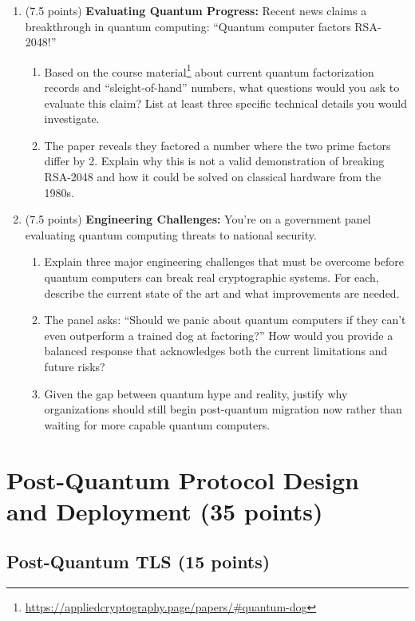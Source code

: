 \documentclass[10pt,a4paper,american]{article}
\begin{document}
\begin{enumerate}
	\item (7.5 points) \textbf{Evaluating Quantum Progress:}
	      Recent news claims a breakthrough in quantum computing: ``Quantum computer factors RSA-2048!''
	      \begin{enumerate}
		      \item Based on the course material\footnote{\url{https://appliedcryptography.page/papers/\#quantum-dog}} about current quantum factorization records and ``sleight-of-hand'' numbers, what questions would you ask to evaluate this claim? List at least three specific technical details you would investigate.
		      \item The paper reveals they factored a number where the two prime factors differ by 2. Explain why this is not a valid demonstration of breaking RSA-2048 and how it could be solved on classical hardware from the 1980s.
	      \end{enumerate}
	\item (7.5 points) \textbf{Engineering Challenges:}
	      You're on a government panel evaluating quantum computing threats to national security.
	      \begin{enumerate}
		      \item Explain three major engineering challenges that must be overcome before quantum computers can break real cryptographic systems. For each, describe the current state of the art and what improvements are needed.
		      \item The panel asks: ``Should we panic about quantum computers if they can't even outperform a trained dog at factoring?'' How would you provide a balanced response that acknowledges both the current limitations and future risks?
		      \item Given the gap between quantum hype and reality, justify why organizations should still begin post-quantum migration now rather than waiting for more capable quantum computers.
	      \end{enumerate}
\end{enumerate}

\section{Post-Quantum Protocol Design and Deployment (35 points)}

\subsection{Post-Quantum TLS (15 points)}
\end{document}
